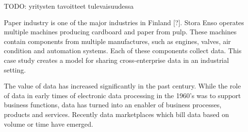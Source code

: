 TODO: yritysten tavoitteet tulevaisuudessa















Paper industry is one of the major industries in Finland [?]. Stora Enso operates multiple machines producing cardboard and paper from pulp. These machines contain components from multiple manufactures, such as engines, valves, air condition and automation systems. Each of these components collect data. This case study creates a model for sharing cross-enterprise data in an industrial setting. 

The value of data has increased significantly in the past century. While the role of data in early times of electronic data processing in the 1960's was to support business functions, data has turned into an enabler of business processes, products and services. Recently data marketplaces which bill data based on volume or time have emerged. \cite{online}

\begin{center}
\end{center}




